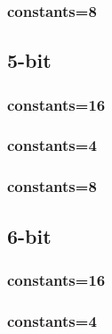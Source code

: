 \documentclass{article}
\begin{document}
\subsubsection*{constants=8}
\begin{figure}[H]
\centering
\resizebox{0.95\linewidth}{!}{}
\end{figure}
\subsection*{5-bit}
\subsubsection*{constants=16}
\begin{figure}[H]
\centering
\resizebox{0.95\linewidth}{!}{}
\end{figure}
\subsubsection*{constants=4}
\begin{figure}[H]
\centering
\resizebox{0.95\linewidth}{!}{}
\end{figure}
\subsubsection*{constants=8}
\begin{figure}[H]
\centering
\resizebox{0.95\linewidth}{!}{}
\end{figure}
\subsection*{6-bit}
\subsubsection*{constants=16}
\begin{figure}[H]
\centering
\resizebox{0.95\linewidth}{!}{}
\end{figure}
\subsubsection*{constants=4}
\begin{figure}[H]
\centering
\resizebox{0.95\linewidth}{!}{}
\end{figure}
\end{document}

